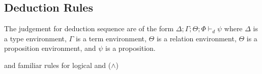 \documentclass{article}
\begin{document}
\subsection{Deduction Rules}
The judgement for deduction sequence are of the form $\Delta ; \Gamma ; \Theta ; \Phi \vdash_d \psi$ 
where $\Delta$ is a type environment, $\Gamma$ is a term environment, $\Theta$ is a relation environment, 
$\Theta$ is a proposition environment, and $\psi$ is a proposition.
\begin{prooftree}
\end{prooftree}

\begin{prooftree}
\end{prooftree}

\begin{prooftree}
\end{prooftree}

\begin{prooftree}
\end{prooftree}
and familiar rules for logical and ($\land$)

\begin{prooftree}
\end{prooftree}

\begin{prooftree}
\end{prooftree}
\end{document}
